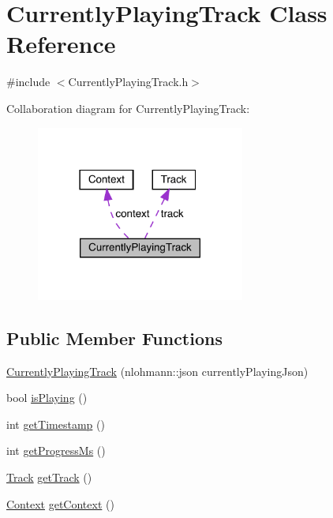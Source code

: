 \hypertarget{class_currently_playing_track}{}\section{Currently\+Playing\+Track Class Reference}
\label{class_currently_playing_track}


{\ttfamily \#include $<$Currently\+Playing\+Track.\+h$>$}



Collaboration diagram for Currently\+Playing\+Track\+:
\nopagebreak
\begin{figure}[H]
\begin{center}
\leavevmode
\includegraphics[width=194pt]{class_currently_playing_track__coll__graph}
\end{center}
\end{figure}
\subsection*{Public Member Functions}
\begin{DoxyCompactItemize}
\item 
\mbox{\hyperlink{class_currently_playing_track_a6855d511ae03b384fe6683faf2280e67}{Currently\+Playing\+Track}} (nlohmann\+::json currently\+Playing\+Json)
\item 
bool \mbox{\hyperlink{class_currently_playing_track_a5c256c9a9ab797068400e8e14ee0a030}{is\+Playing}} ()
\item 
int \mbox{\hyperlink{class_currently_playing_track_a66c065d91288bfc978c28747b2125184}{get\+Timestamp}} ()
\item 
int \mbox{\hyperlink{class_currently_playing_track_aa0dda901c7aaca4b00a7be7ddb26de52}{get\+Progress\+Ms}} ()
\item 
\mbox{\hyperlink{class_track}{Track}} \mbox{\hyperlink{class_currently_playing_track_a339e657df2ff1ccb373e31f37dd05c87}{get\+Track}} ()
\item 
\mbox{\hyperlink{class_context}{Context}} \mbox{\hyperlink{class_currently_playing_track_a00ecce67b84edab8bccb838769f202fe}{get\+Context}} ()
\end{DoxyCompactItemize}
